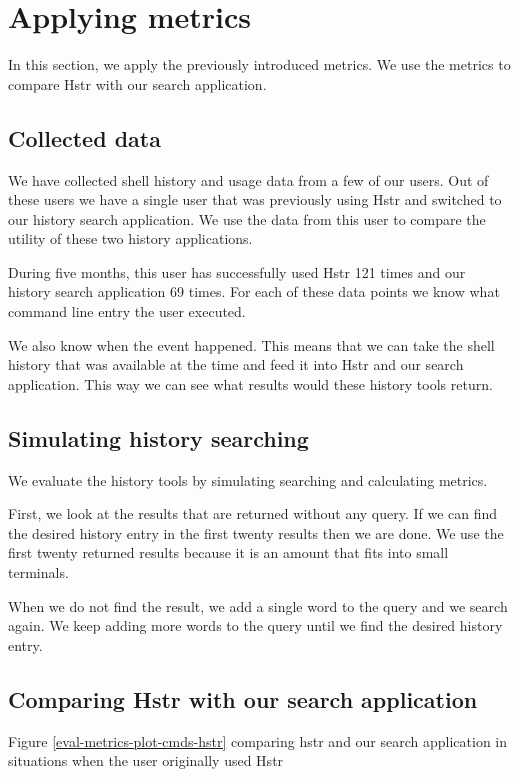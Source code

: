 \section{Applying metrics}

In this section, we apply the previously introduced metrics. We use the metrics to compare Hstr with our search application.

\subsection{Collected data}

We have collected shell history and usage data from a few of our users. Out of these users we have a single user that was previously using Hstr and switched to our history search application. We use the data from this user to compare the utility of these two history applications.

During five months, this user has successfully used Hstr 121 times and our history search application 69 times. For each of these data points we know what command line entry the user executed. 

We also know when the event happened. This means that we can take the shell history that was available at the time and feed it into Hstr and our search application. This way we can see what results would these history tools return.

\subsection{Simulating history searching}

We evaluate the history tools by simulating searching and calculating metrics.

First, we look at the results that are returned without any query. If we can find the desired history entry in the first twenty results then we are done. We use the first twenty returned results because it is an amount that fits into small terminals. 

When we do not find the result, we add a single word to the query and we search again. We keep adding more words to the query until we find the desired history entry.

\subsection{Comparing Hstr with our search application}

Figure \ref{eval-metrics-plot-cmds-hstr} comparing hstr and our search application in situations when the user originally used Hstr

